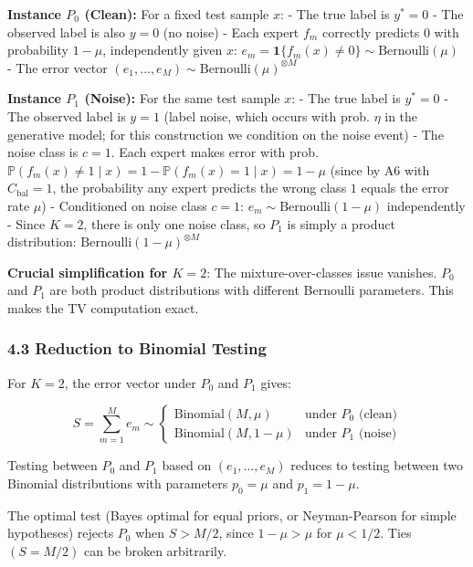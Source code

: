\documentclass[
  12pt,
]{ctexart}
\begin{document}
\textbf{Instance \(P_0\) (Clean):} For a fixed test sample \(x\): - The
true label is \(y^* = 0\) - The observed label is also \(y = 0\) (no
noise) - Each expert \(f_m\) correctly predicts \(0\) with probability
\(1-\mu\), independently given \(x\):
\(e_m = \mathbf{1}\{f_m(x) \neq 0\} \sim \text{Bernoulli}(\mu)\) - The
error vector \((e_1,\dots,e_M) \sim \text{Bernoulli}(\mu)^{\otimes M}\)

\textbf{Instance \(P_1\) (Noise):} For the same test sample \(x\): - The
true label is \(y^* = 0\) - The observed label is \(y = 1\) (label
noise, which occurs with prob. \(\eta\) in the generative model; for
this construction we condition on the noise event) - The noise class is
\(c = 1\). Each expert makes error with prob.
\(\mathbb{P}(f_m(x) \neq 1 \mid x) = 1 - \mathbb{P}(f_m(x) = 1 \mid x) = 1 - \mu\)
(since by A6 with \(C_{\text{bal}}=1\), the probability any expert
predicts the wrong class \(1\) equals the error rate \(\mu\)) -
Conditioned on noise class \(c=1\): \(e_m \sim \text{Bernoulli}(1-\mu)\)
independently - Since \(K=2\), there is only one noise class, so \(P_1\)
is simply a product distribution:
\(\text{Bernoulli}(1-\mu)^{\otimes M}\)

\textbf{Crucial simplification for \(K=2\)}: The mixture-over-classes
issue vanishes. \(P_0\) and \(P_1\) are both product distributions with
different Bernoulli parameters. This makes the TV computation exact.

\subsubsection{4.3 Reduction to Binomial
Testing}\label{reduction-to-binomial-testing}

For \(K=2\), the error vector under \(P_0\) and \(P_1\) gives:

\[S = \sum_{m=1}^M e_m \sim \begin{cases}
\text{Binomial}(M, \mu) & \text{under } P_0 \text{ (clean)} \\
\text{Binomial}(M, 1-\mu) & \text{under } P_1 \text{ (noise)}
\end{cases}\]

Testing between \(P_0\) and \(P_1\) based on \((e_1,\dots,e_M)\) reduces
to testing between two Binomial distributions with parameters
\(p_0 = \mu\) and \(p_1 = 1-\mu\).

The optimal test (Bayes optimal for equal priors, or Neyman-Pearson for
simple hypotheses) rejects \(P_0\) when \(S > M/2\), since
\(1-\mu > \mu\) for \(\mu < 1/2\). Ties \((S = M/2)\) can be broken
arbitrarily.
\end{document}

